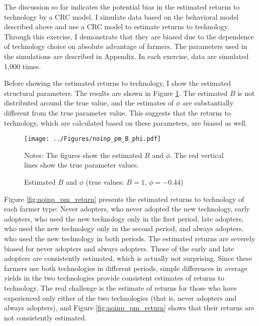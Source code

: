 \documentclass[11pt,letterpaper]{article}
\begin{document}
The discussion so far indicates the potential bias in the estimated returns to technology by a CRC model.
I simulate data based on the behavioral model described above and use a CRC model to estimate returns to technology.
Through this exercise, I demonstrate that they are biased due to the dependence of technology choice on absolute advantage of farmers.
The parameters used in the simulations are described in Appendix.
In each exercise, data are simulated 1,000 times.

Before showing the estimated returns to technology, I show the estimated structural parameters.
The results are shown in Figure \ref{fig:noinp_pm_B_phi}.
The estimated $B$ is not distributed around the true value, and the estimates of $\phi$ are substantially different from the true parameter value.
This suggests that the returns to technology, which are calculated based on these parameters, are biased as well.

\begin{figure}[H]
  \centering
  \caption{Estimated $B$ and $\phi$ (true values: $B = 1$, $\phi = -0.44$)}
  \texttt{[image: ../Figures/noinp\_pm\_B\_phi.pdf]}
  \label{fig:noinp_pm_B_phi}
  \footnotesize
  \begin{tablenotes}
    \item Notes:
      The figures show the estimated $B$ and $\phi$.
      The red vertical lines show the true parameter values.
  \end{tablenotes}
\end{figure}

Figure \ref{fig:noinp_pm_return} presents the estimated returns to technology of each farmer type: 
Never adopters, who never adopted the new technology,
early adopters, who used the new technology only in the first period,
late adopters, who used the new technology only in the second period, and
always adopters, who used the new technology in both periods.
The estimated returns are severely biased for never adopters and always adopters.
Those of the early and late adopters are consistently estimated, which is actually not surprising.
Since these farmers use both technologies in different periods, simple differences in average yields in the two technologies provide consistent estimates of returns to technology.
The real challenge is the estimate of returns for those who have experienced only either of the two technologies (that is, never adopters and always adopters), and Figure \ref{fig:noinp_pm_return} shows that their returns are not consistently estimated.
\end{document}
